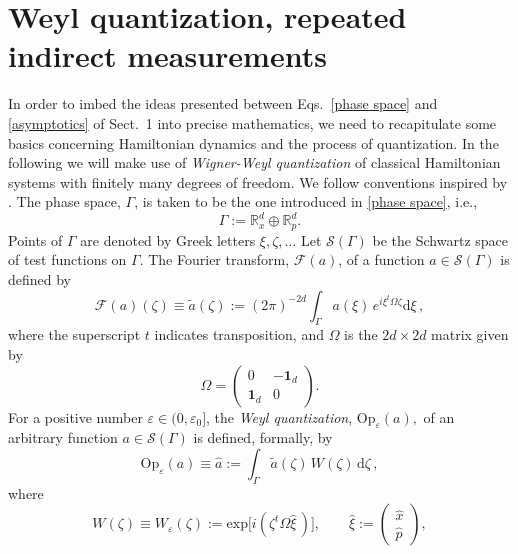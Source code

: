 \documentclass[11pt]{article}
\begin{document}
\section{Weyl quantization, repeated indirect measurements} \label{quantization} 
In order to imbed the ideas presented between Eqs.~\eqref{phase space} and \eqref{asymptotics} of Sect.~1 
into precise mathematics, we need to recapitulate some basics concerning Hamiltonian dynamics and the 
process of quantization. In the following we will make use of \textit{Wigner-Weyl quantization} of classical Hamiltonian 
systems with finitely many degrees of freedom. We follow conventions inspired by \cite[\S 8.4]{DerGerard}. 
The phase space, $\Gamma$, is taken to be the one introduced in \eqref{phase space}, i.e.,
\begin{equation}\label{ps}
\Gamma:= \mathbb{R}^{d}_x \oplus \mathbb{R}^{d}_p.
\end{equation}
Points of $\Gamma$ are denoted by Greek letters $\xi, \zeta, \dots$ Let $\mathcal{S}(\Gamma)$ be the Schwartz 
space of test functions on $\Gamma$. The Fourier transform, $\mathcal{F}(a)$, of a function 
$a\in \mathcal{S}(\Gamma)$ is defined by
\begin{equation}\label{FT}
\mathcal{F}(a)(\zeta)\equiv \tilde{a}(\zeta):= (2 \pi)^{-2d}\int_{\Gamma} a(\xi) \,e^{i \xi^{t}\Omega\zeta} \text{d}\xi\,,
\end{equation}
where the superscript $t$ indicates transposition, and $\Omega$ is the $2d\times 2d$ matrix given by
\begin{equation}\label{Omega}
\Omega = \begin{pmatrix} 0& -\mathbf{1}_{d}\\ \mathbf{1}_{d}& 0 \end{pmatrix}.
\end{equation}
For a positive number $\varepsilon \in (0, \varepsilon_0]$, the \textit{Weyl quantization}, $\text{Op}_{\varepsilon}(a),$ 
of an arbitrary function $a\in \mathcal{S}(\Gamma)$ is defined, formally, by
\begin{equation}\label{WQ}
\text{Op}_{\varepsilon}(a)\equiv \widehat{a}:= \int_{\Gamma} \tilde{a}(\zeta)\, W(\zeta)\, \text{d}\zeta\,,
\end{equation}
where
\begin{equation}\label{W Op}
W(\zeta)\equiv W_{\varepsilon}(\zeta) :=\text{exp}\big[i(\zeta^{t}\Omega\widehat{\xi}\,)\big], \qquad \widehat{\xi}:= \begin{pmatrix} \hat{x} \\ \hat{p} \end{pmatrix},
\end{equation}
\end{document}
